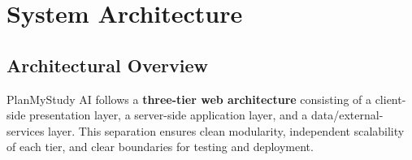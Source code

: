 \documentclass[12pt,a4paper]{report}
\begin{document}
\chapter{System Architecture}

\section{Architectural Overview}
PlanMyStudy AI follows a \textbf{three-tier web architecture} consisting of a client-side presentation layer, a server-side application layer, and a data/external-services layer. This separation ensures clean modularity, independent scalability of each tier, and clear boundaries for testing and deployment.
\end{document}
